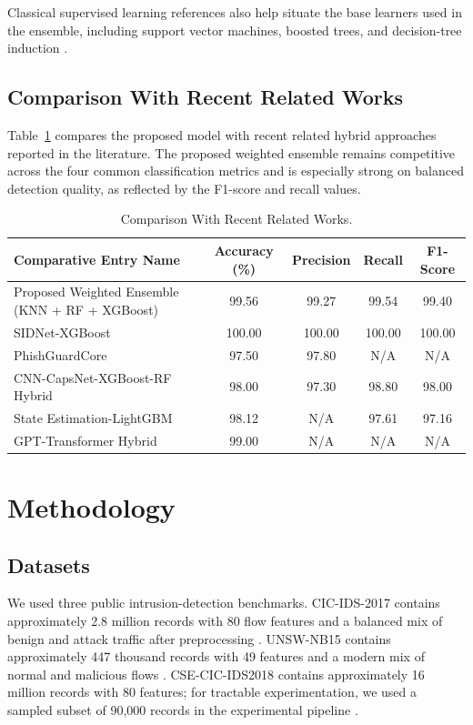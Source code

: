 \documentclass[conference]{IEEEtran}
\begin{document}
Classical supervised learning references also help situate the base learners used in the ensemble, including support vector machines, boosted trees, and decision-tree induction \cite{cortes1995support,friedman2001greedy,quinlan1993c45,hastie2009elements}.

\subsection{Comparison With Recent Related Works}
Table~\ref{tab:related_comparison} compares the proposed model with recent related hybrid approaches reported in the literature. The proposed weighted ensemble remains competitive across the four common classification metrics and is especially strong on balanced detection quality, as reflected by the F1-score and recall values.

\begin{table}[htbp]
\caption{Comparison With Recent Related Works.}
\label{tab:related_comparison}
\centering
\small
\begin{tabular}{lcccc}
\toprule
Comparative Entry Name & Accuracy (\%) & Precision & Recall & F1-Score \\
\midrule
Proposed Weighted Ensemble (KNN + RF + XGBoost) & 99.56 & 99.27 & 99.54 & 99.40 \\
SIDNet-XGBoost & 100.00 & 100.00 & 100.00 & 100.00 \\
PhishGuardCore & 97.50 & 97.80 & N/A & N/A \\
CNN-CapsNet-XGBoost-RF Hybrid & 98.00 & 97.30 & 98.80 & 98.00 \\
State Estimation-LightGBM & 98.12 & N/A & 97.61 & 97.16 \\
GPT-Transformer Hybrid & 99.00 & N/A & N/A & N/A \\
\bottomrule
\end{tabular}
\end{table}

\section{Methodology}
\subsection{Datasets}
We used three public intrusion-detection benchmarks. CIC-IDS-2017 contains approximately 2.8 million records with 80 flow features and a balanced mix of benign and attack traffic after preprocessing \cite{sharafaldin2018toward2017}. UNSW-NB15 contains approximately 447 thousand records with 49 features and a modern mix of normal and malicious flows \cite{moustafa2015unsw}. CSE-CIC-IDS2018 contains approximately 16 million records with 80 features; for tractable experimentation, we used a sampled subset of 90,000 records in the experimental pipeline \cite{cic2018}.
\end{document}
